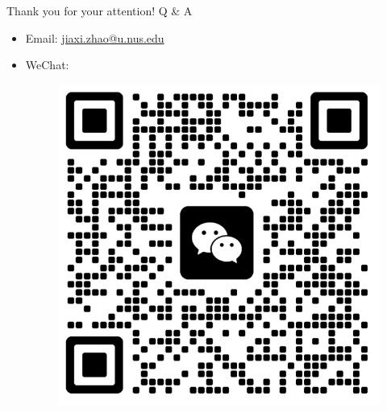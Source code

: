 \documentclass[aspectratio=169]{beamer}
\begin{document}
\begin{frame}
	Thank you for your attention!
	Q \& A
	\begin{itemize}
		\item Email: \href{mailto:jiaxi.zhao@u.nus.edu}{jiaxi.zhao@u.nus.edu} 
		\item WeChat:
		\begin{figure}[ht] 
			\centering 
			\includegraphics[width=.3\textwidth]{fig/qrcode.jpg} 
		\end{figure}
	\end{itemize}
\end{frame}




 
 
\end{document}
